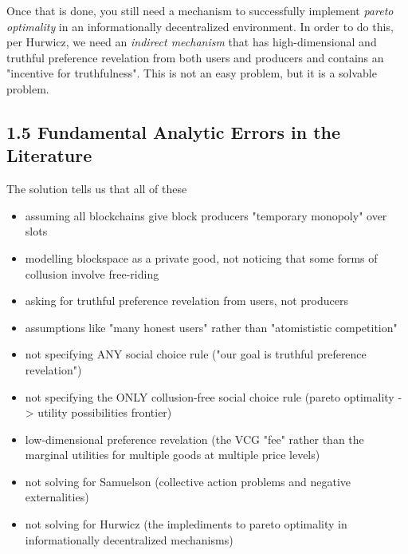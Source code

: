 \documentclass[oneside]{article}   	%
\begin{document}
Once that is done, you still need a mechanism to successfully implement \textit{pareto optimality} in an informationally decentralized environment. In order to do this, per Hurwicz, we need an \textit{indirect mechanism} that has high-dimensional and truthful preference revelation from both users and producers and contains an "incentive for truthfulness". This is not an easy problem, but it is a solvable problem.


\subsection*{1.5 Fundamental Analytic Errors in the Literature}

The solution tells us that all of these 

\begin{itemize}
 \item assuming all blockchains give block producers "temporary monopoly" over slots
 \item modelling blockspace as a private good, not noticing that some forms of collusion involve free-riding
 \item asking for truthful preference revelation from users, not producers
 \item assumptions like "many honest users" rather than "atomististic competition"
 \item not specifying ANY social choice rule ("our goal is truthful preference revelation")
 \item not specifying the ONLY collusion-free social choice rule (pareto optimality -> utility possibilities frontier)
 \item low-dimensional preference revelation (the VCG "fee" rather than the marginal utilities for multiple goods at multiple price levels)
 \item not solving for Samuelson (collective action problems and negative externalities)
 \item not solving for Hurwicz (the implediments to pareto optimality in informationally decentralized mechanisms)
\end{itemize}


\pagebreak
\end{document}
